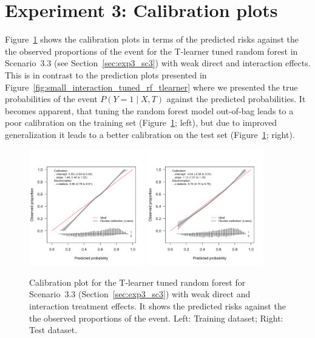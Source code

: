\clearpage


\section{Experiment 3: Calibration plots} \label{sec:calibration_tuned_rf}

Figure~\ref{fig:calibration_tuned_rf} shows the calibration plots in terms of the predicted risks against the the observed proportions of the event for the T-learner tuned random forest in Scenario~3.3 (see Section~\ref{sec:exp3_sc3}) with weak direct and interaction effects. This is in contrast to the prediction plots presented in Figure~\ref{fig:small_interaction_tuned_rf_tlearner} where we presented the true probabilities of the event $P(Y=1 \mid X, T)$ against the predicted probabilities. It becomes apparent, that tuning the random forest model out-of-bag leads to a poor calibration on the training set (Figure~\ref{fig:calibration_tuned_rf}; left), but due to improved generalization it leads to a better calibration on the test set (Figure~\ref{fig:calibration_tuned_rf}; right).

\begin{figure}[htbp]
\centering
\includegraphics[width=0.45\textwidth]{img/results_ITE_simulation/small_interaction_tuned_rf_tlearnertrain_calibration_plot.png}
\includegraphics[width=0.45\textwidth]{img/results_ITE_simulation/small_interaction_tuned_rf_tlearnertest_calibration_plot.png}
\caption{Calibration plot for the T-learner tuned random forest for Scenario~3.3 (Section~\ref{sec:exp3_sc3}) with weak direct and interaction treatment effects. It shows the predicted risks against the the observed proportions of the event. Left: Training dataset; Right: Test dataset.}
\label{fig:calibration_tuned_rf}
\end{figure}


